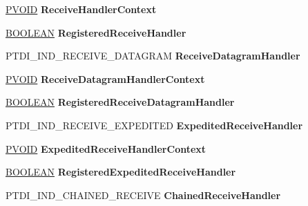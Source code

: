\begin{DoxyCompactItemize}
\hyperlink{interfacevoid}{P\+V\+O\+ID} {\bfseries Receive\+Handler\+Context}
\item 
\mbox{\label{struct___a_d_d_r_e_s_s___f_i_l_e_a8cdfeff327e5fd2a6e2f0d8ed09bb5c3}} 
\hyperlink{_processor_bind_8h_a112e3146cb38b6ee95e64d85842e380a}{B\+O\+O\+L\+E\+AN} {\bfseries Registered\+Receive\+Handler}
\item 
\mbox{\label{struct___a_d_d_r_e_s_s___f_i_l_e_aac24a69cfe0426952b749cd64211202b}} 
P\+T\+D\+I\+\_\+\+I\+N\+D\+\_\+\+R\+E\+C\+E\+I\+V\+E\+\_\+\+D\+A\+T\+A\+G\+R\+AM {\bfseries Receive\+Datagram\+Handler}
\item 
\mbox{\label{struct___a_d_d_r_e_s_s___f_i_l_e_aa8bcfdb22dd2a759b59b554f5bd6b8c8}} 
\hyperlink{interfacevoid}{P\+V\+O\+ID} {\bfseries Receive\+Datagram\+Handler\+Context}
\item 
\mbox{\label{struct___a_d_d_r_e_s_s___f_i_l_e_a014fce75bb4b6f20121f548346a898ec}} 
\hyperlink{_processor_bind_8h_a112e3146cb38b6ee95e64d85842e380a}{B\+O\+O\+L\+E\+AN} {\bfseries Registered\+Receive\+Datagram\+Handler}
\item 
\mbox{\label{struct___a_d_d_r_e_s_s___f_i_l_e_addfbb563071a0aa2fab2fdf325ecc5db}} 
P\+T\+D\+I\+\_\+\+I\+N\+D\+\_\+\+R\+E\+C\+E\+I\+V\+E\+\_\+\+E\+X\+P\+E\+D\+I\+T\+ED {\bfseries Expedited\+Receive\+Handler}
\item 
\mbox{\label{struct___a_d_d_r_e_s_s___f_i_l_e_a58f66e1192bc8952ac81ed07f6f47881}} 
\hyperlink{interfacevoid}{P\+V\+O\+ID} {\bfseries Expedited\+Receive\+Handler\+Context}
\item 
\mbox{\label{struct___a_d_d_r_e_s_s___f_i_l_e_ac9304c8043f615cd2c3c11e0ceac81af}} 
\hyperlink{_processor_bind_8h_a112e3146cb38b6ee95e64d85842e380a}{B\+O\+O\+L\+E\+AN} {\bfseries Registered\+Expedited\+Receive\+Handler}
\item 
\mbox{\label{struct___a_d_d_r_e_s_s___f_i_l_e_a20ef0c0b66093a676d971ae52a9860ab}} 
P\+T\+D\+I\+\_\+\+I\+N\+D\+\_\+\+C\+H\+A\+I\+N\+E\+D\+\_\+\+R\+E\+C\+E\+I\+VE {\bfseries Chained\+Receive\+Handler}

\end{DoxyCompactItemize}
